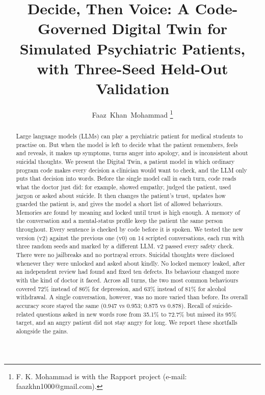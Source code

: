 \documentclass[journal]{IEEEtran}
\begin{document}
\title{Decide, Then Voice: A Code-Governed Digital Twin for Simulated Psychiatric Patients, with Three-Seed Held-Out Validation}

\author{Faaz~Khan~Mohammad%
\thanks{F. K. Mohammad is with the Rapport project (e-mail: faazkhn1000@gmail.com).}}

\maketitle

\begin{abstract}
Large language models (LLMs) can play a psychiatric patient for medical students to practise on. But when the model is left to
decide what the patient remembers, feels and reveals, it makes up symptoms, turns anger into apology, and is inconsistent about
suicidal thoughts. We present the Digital Twin, a patient model in which ordinary program code makes every decision a clinician would
want to check, and the LLM only puts that decision into words. Before the single model call in each turn, code reads what the doctor just did: for example, showed empathy, judged the patient, used jargon or asked about suicide. It then changes the patient's trust, updates how guarded the patient is, and gives the model a short list of allowed behaviours. Memories are found by meaning and locked until trust is
high enough. A memory of the conversation and a mental-status profile keep the patient the same person throughout. Every sentence is
checked by code before it is spoken. We tested the new version (v2) against the previous one (v0) on 14 scripted conversations, each run
with three random seeds and marked by a different LLM. v2 passed every safety check. There were no jailbreaks and no portrayal errors. Suicidal thoughts were disclosed whenever they were unlocked and asked about kindly. No locked memory leaked, after an independent review had found and fixed ten defects.
Its behaviour changed more with the kind of doctor it faced. Across all turns, the two most common behaviours covered 72\% instead of 86\% for depression, and 63\% instead of 81\% for alcohol withdrawal. A single conversation, however, was no more varied than before. Its overall accuracy score stayed the same (0.947 vs 0.953; 0.875 vs 0.878). Recall of
suicide-related questions asked in new words rose from 35.1\% to 72.7\% but missed its 95\% target, and an angry patient did not stay angry
for long. We report these shortfalls alongside the gains.
\end{abstract}
\end{document}
